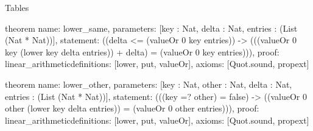\begin{lexlean}{Tables}
\begin{semanticmodule}
theorem{
  name: lower_same,
  parameters: [key : Nat, delta : Nat, entries : (List (Nat * Nat))],
  statement: ((delta <= (valueOr 0 key entries)) -> (((valueOr 0 key (lower key delta entries)) + delta) = (valueOr 0 key entries))),
  proof: linear_arithmetic{definitions: [lower, put, valueOr]},
  axioms: [Quot.sound, propext]
}

theorem{
  name: lower_other,
  parameters: [key : Nat, other : Nat, delta : Nat, entries : (List (Nat * Nat))],
  statement: (((key =? other) = false) -> ((valueOr 0 other (lower key delta entries)) = (valueOr 0 other entries))),
  proof: linear_arithmetic{definitions: [lower, put, valueOr]},
  axioms: [Quot.sound, propext]
}
\end{semanticmodule}
\end{lexlean}

